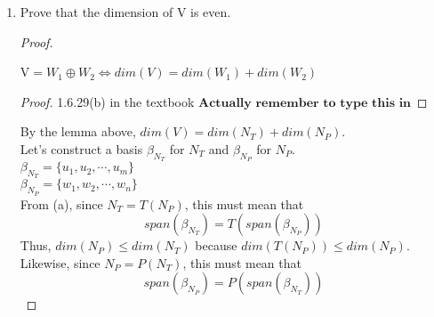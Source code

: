 \documentclass[11pt]{scrartcl}
\begin{document}
\begin{enumerate}[label=\alph*.]
{\begin{proof}
\begin{enumerate}[label=\roman*.]
{\begin{enumerate}[label=\arabic*.]
{				                  by Theorem 2.11. Since $\mathrm{V}$ is a vector space $n_t + n_p \in V$ by closure under addition.\\
				                  Thus, $ x \in \mathrm{V}$ and it follows that $N_T + N_P \subseteq \mathrm{V}$.
				                  }
				            \item{
				                  $\mathrm{V} \subseteq N_T + N_P $\\
				                  Let $x \in V$. We know that $x = P \circ T(x) + T \circ P(x)$.\\
				                  Notice that $P \circ T(x) \in N_P$ because $P(P \circ T(x)) = 0$.\\
				                  Similarly, $T \circ P(x) \in N_T$ because $T(T \circ P(x)) = 0$.\\
				                  Thus, $N_T + N_P \subseteq \mathrm{V}$.
				                  }
			            \end{enumerate}
			            Therefore, $N_T + N_P = \mathrm{V}$.
			            }
		      \end{enumerate}
		      Therefore, by definition $\mathrm{V} = N_T \oplus N_P$.
	      \end{proof}
	      }
	\item{
	      Prove that the dimension of $\mathrm{V}$ is even.
	      \begin{proof}\
		      \begin{lemma}
			      $\mathrm{V} = W_1 \oplus W_2 \Leftrightarrow dim(V) = dim(W_1) + dim(W_2)$\
			      \begin{proof}
					  1.6.29(b) in the textbook
					  $\textbf{Actually remember to type this in}$
			      \end{proof}
		      \end{lemma}
		      By the lemma above, $dim(V) = dim(N_T) + dim(N_P)$.\\
		      Let's construct a basis $\beta_{N_T}$ for $N_T$ and $\beta_{N_P}$ for $N_P$.\\
		      $\beta_{N_T} = \{u_1, u_2, \cdots, u_m\}$\\
		      $\beta_{N_P} = \{w_1, w_2, \cdots, w_n\}$\\
		      From (a), since $N_T = T(N_P)$, this must mean that $$span(\beta_{N_T}) = T(span(\beta_{N_P})) $$ %
		      Thus, $dim(N_P) \leq dim(N_T)$ because  $dim(T(N_P)) \leq dim(N_P)$.\\
		      Likewise, since $N_P = P(N_T)$, this must mean that $$span(\beta_{N_P}) = P(span(\beta_{N_T})) $$ %

\end{proof}}
\end{enumerate}
\end{document}
